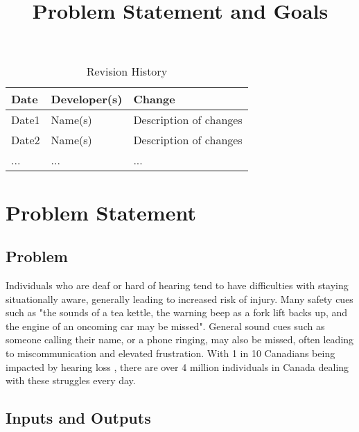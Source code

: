 \documentclass{article}
\title{Problem Statement and Goals\\\progname}
\author{\authname}
\date{}
\begin{document}
\maketitle

\begin{table}[hp]
\caption{Revision History} \label{TblRevisionHistory}
\begin{tabularx}{\textwidth}{llX}
\toprule
\textbf{Date} & \textbf{Developer(s)} & \textbf{Change}\\
\midrule
Date1 & Name(s) & Description of changes\\
Date2 & Name(s) & Description of changes\\
... & ... & ...\\
\bottomrule
\end{tabularx}
\end{table}

\section{Problem Statement}



\subsection{Problem}

Individuals who are deaf or hard of hearing tend to have difficulties with staying situationally aware, generally leading to increased risk of injury.
Many safety cues such as "the sounds of a tea kettle, the warning beep as a fork lift backs up, and the engine of an oncoming car may be missed". \cite{Masterson2016}
General sound cues such as someone calling their name, or a phone ringing, may also be missed, often leading to miscommunication and elevated frustration.
With 1 in 10 Canadians being impacted by hearing loss \cite{Healthing2025}, there are over 4 million individuals in Canada dealing with these struggles every day.


\subsection{Inputs and Outputs}
\end{document}
